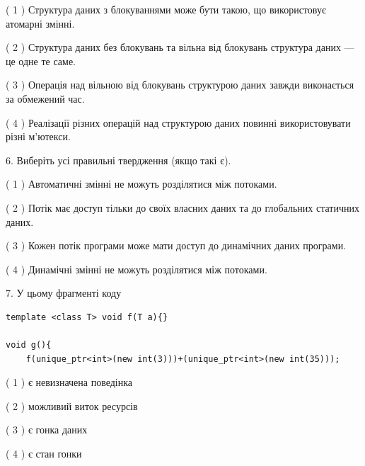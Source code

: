 \documentclass[12pt, ukrainian]{article}
\begin{document}
\begin {large}
{( 1 ) Структура даних з блокуваннями може бути такою, що використовує атомарні змінні.%

( 2 ) Структура даних без блокувань та вільна від блокувань структура даних --- це одне те саме.%

( 3 ) Операція над вільною від блокувань структурою даних завжди виконається за обмежений час.%

( 4 ) Реалізації різних операцій над структурою даних повинні використовувати різні м’ютекси.%
\newpage



\vspace{5mm}
6. Виберіть усі правильні твердження (якщо такі є).\par
\vspace{2mm}

( 1 ) Автоматичні змінні не можуть розділятися між потоками.%

( 2 ) Потік має доступ тільки до своїх власних даних та до глобальних статичних даних.%

( 3 ) Кожен потік програми може мати доступ до динамічних даних програми.%

( 4 ) Динамічні змінні не можуть розділятися між потоками.%


\vspace{5mm}
7. У цьому фрагменті коду
\begin{verbatim}
template <class T> void f(T a){}

void g(){
    f(unique_ptr<int>(new int(3)))+(unique_ptr<int>(new int(35)));
\end{verbatim}

( 1 ) є невизначена поведінка%

( 2 ) можливий виток ресурсів%

( 3 ) є гонка даних%

( 4 ) є стан гонки%
}
\end {large}
\end{document}
